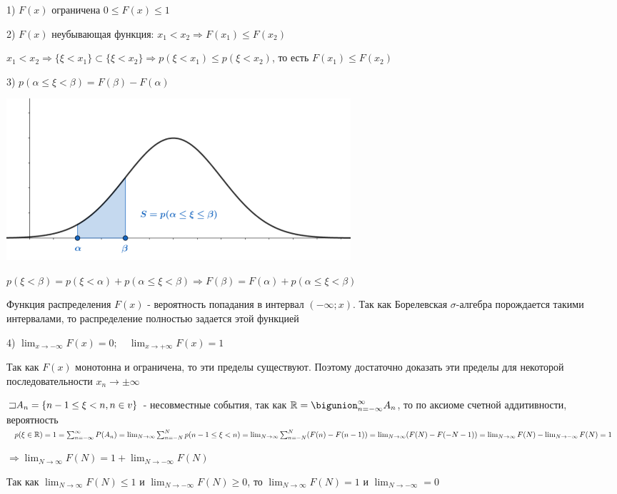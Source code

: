 \documentclass[12pt]{article}
\begin{document}
    1) $F(x)$ ограничена $0 \leq F(x) \leq 1$

    2) $F(x)$ неубывающая функция: $x_1 < x_2 \Longrightarrow F(x_1) \leq F(x_2)$ 

    \begin{MyProof}
        $x_1 < x_2 \Longrightarrow \{\xi < x_1\} \subset \{\xi < x_2\} \Longrightarrow p(\xi < x_1) \leq p(\xi < x_2)$, то есть $F(x_1) \leq F(x_2)$
    \end{MyProof}

    3) $p(\alpha \leq \xi < \beta) = F(\beta) - F(\alpha)$

    \includegraphics[height=6cm]{probtheory/images/probtheory_2024_10_22_4}

    \begin{MyProof}
        $p(\xi < \beta) = p(\xi < \alpha) + p(\alpha \leq \xi < \beta) \Longrightarrow F(\beta) = F(\alpha) + p(\alpha \leq \xi < \beta)$
    \end{MyProof}
    
    \Notas Функция распределения $F(x)$ - вероятность попадания в интервал $(-\infty; x)$. Так как Борелевская $\sigma$-алгебра порождается такими интервалами,
    то распределение полностью задается этой функцией

    4) $\lim_{x \to -\infty} F(x) = 0; \quad \lim_{x \to +\infty} F(x) = 1$

    \begin{MyProof}
        Так как $F(x)$ монотонна и ограничена, то эти пределы существуют. Поэтому достаточно доказать эти пределы для некоторой последовательности $x_n \to \pm \infty$

        $\mathord{\sqsupset} A_n = \{n - 1 \leq \xi < n, n \in v\}$ - несовместные события, так как $\Real = \bigunion_{n = -\infty}^\infty A_n$, то
        по аксиоме счетной аддитивности, вероятность $p(\xi \in \mathbb{R}) = 1 = \sum_{n = -\infty}^\infty P(A_n) = \lim_{N \to \infty} \sum_{n = -N}^N p(n - 1 \leq \xi < n) = 
        \lim_{N \to \infty} \sum_{n = -N}^N (F(n) - F(n - 1)) = \lim_{N \to \infty} (F(N) - F(-N - 1)) = \lim_{N \to \infty} F(N) - \lim_{N \to -\infty} F(N) = 1$

        $\Longrightarrow \lim_{N \to \infty} F(N) = 1 + \lim_{N \to -\infty} F(N) $

        Так как $\lim_{N \to \infty} F(N) \leq 1$ и $\lim_{N \to -\infty} F(N) \geq 0$, то $\lim_{N \to \infty} F(N) = 1$ и $\lim_{N \to -\infty} = 0$
    \end{MyProof}
    
\end{document}

